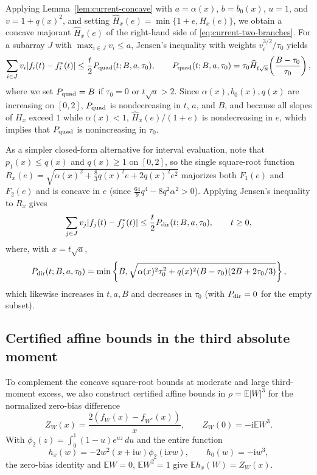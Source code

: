 \documentclass[11pt]{article}
\numberwithin{equation}{section}
\theoremstyle{remark}
\newcommand{\E}{\mathbb E}
\newcommand{\ii}{\mathrm i}
\begin{document}
Applying Lemma~\ref{lem:current-concave} with $a=\alpha(x)$, $b=b_0(x)$,
$u=1$, and $v=1+q(x)^2$, and setting $\widehat H_x(e)=\min\{1+e,H_x(e)\}$,
we obtain a concave majorant $\widehat H_x(e)$ of the right-hand side of
\eqref{eq:current-two-branches}. For a subarray $J$ with $\max_{i\in J}v_i\le a$,
Jensen's inequality with weights $v_i^{3/2}/\tau_0$ yields
\begin{equation}\label{eq:current-prefactor}
 \sum_{i\in J} v_i|f_i(t)-f_i^*(t)|
 \le\frac t2P_{\rm quad}(t;B,a,\tau_0),\qquad
 P_{\rm quad}(t;B,a,\tau_0)
 =\tau_0\widehat H_{t\sqrt a}\!\left(\frac{B-\tau_0}{\tau_0}\right),
\end{equation}
where we set $P_{\rm quad}=B$ if $\tau_0=0$ or $t\sqrt a>2$. Since
$\alpha(x),b_0(x),q(x)$ are increasing on $[0,2]$, $P_{\rm quad}$ is
nondecreasing in $t$, $a$, and $B$, and because all slopes of $H_x$ exceed
$1$ while $\alpha(x)<1$, $\widehat H_x(e)/(1+e)$ is nondecreasing in $e$,
which implies that $P_{\rm quad}$ is nonincreasing in $\tau_0$.

As a simpler closed-form alternative for interval evaluation, note that
$p_1(x)\le q(x)$ and $q(x)\ge1$ on $[0,2]$, so the single square-root
function $R_x(e)=\sqrt{\alpha(x)^2+\frac83q(x)^2e+2q(x)^2e^2}$ majorizes
both $F_1(e)$ and $F_2(e)$ and is concave in $e$ (since
$\frac{64}{9}q^4-8q^2\alpha^2>0$). Applying Jensen's inequality to $R_x$
gives
\begin{equation}\label{eq:aggregate-error}
 \sum_{j\in J} v_j|f_j(t)-f_j^*(t)|\le\frac t2
 P_{\rm dir}(t;B,a,\tau_0),\qquad t\ge0,
\end{equation}
where, with $x=t\sqrt a$,
\begin{equation}\label{eq:P}
 P_{\rm dir}(t;B,a,\tau_0)=\min\left\{B,
  \sqrt{\alpha(x)^2\tau_0^2+q(x)^2(B-\tau_0)(2B+2\tau_0/3)}\right\},
\end{equation}
which likewise increases in $t,a,B$ and decreases in $\tau_0$ (with
$P_{\rm dir}=0$ for the empty subset).

\subsection{Certified affine bounds in the third absolute moment}\label{sec:current-affine}

To complement the concave square-root bounds at moderate and large third-moment
excess, we also construct certified affine bounds in $\rho=\E|W|^3$ for the
normalized zero-bias difference
\[
 Z_W(x)=\frac{2(f_W(x)-f_{W^*}(x))}{x},\qquad
 Z_W(0)=-\ii \E W^3.
\]
With $\phi_2(z)=\int_0^1(1-u)e^{uz}\,du$ and the entire function
\[
 h_x(w)=-2w^2(x+\ii w)\phi_2(\ii xw),\qquad h_0(w)=-\ii w^3,
\]
the zero-bias identity and $\E W=0$, $\E W^2=1$ give $\E h_x(W)=Z_W(x)$.
\end{document}
